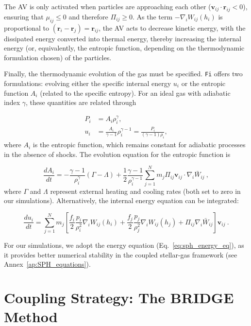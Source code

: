 The AV is only activated when particles are approaching each other ($\mathbf{v}_{ij} \cdot \mathbf{r}_{ij} < 0$), ensuring that $\mu_{ij} \leq 0$ and therefore $\Pi_{ij} \geq 0$. As the term $-\nabla_i W_{ij}(h_i)$ is proportional to $(\mathbf{r}_i - \mathbf{r}_j) = \mathbf{r}_{ij}$, the AV acts to decrease kinetic energy, with the dissipated energy converted into thermal energy, thereby increasing the internal energy (or, equivalently, the entropic function, depending on the thermodynamic formulation chosen) of the particles.

Finally, the thermodynamic evolution of the gas must be specified. \texttt{Fi} offers two formulations: evolving either the specific internal energy $u_i$ or the entropic function $A_i$ (related to the specific entropy). For an ideal gas with adiabatic index $\gamma$, these quantities are related through

\begin{align}
	P_i &= A_i \rho_i^{\gamma}, \label{eq:3.43_poly_eq_state}\\
	u_i &= \frac{A_i}{\gamma - 1} \rho_i^{\gamma - 1} = \frac{P_i}{(\gamma - 1)\rho_i} \label{eq:3.44_int_energy},
\end{align}
where $A_i$ is the entropic function, which remains constant for adiabatic processes in the absence of shocks. The evolution equation for the entropic function is

\begin{equation}
	\frac{dA_i}{dt} = -\frac{\gamma-1}{\rho_i^\gamma} (\Gamma - \Lambda) + \frac{1}{2} \frac{\gamma-1}{\rho_i^{\gamma-1}} \sum_{j=1}^N m_j \Pi_{ij} \mathbf{v}_{ij} \cdot \nabla_i \bar{W}_{ij}~,
\end{equation}
where $\Gamma$ and $\Lambda$ represent external heating and cooling rates (both set to zero in our simulations). Alternatively, the internal energy equation can be integrated:

\begin{equation}
	\frac{d u_i}{d t} = \sum_{j=1}^N m_j \left[ \frac{f_i}{2} \frac{p_i}{\rho_i^2} \nabla_i W_{ij}(h_i) +  \frac{f_j}{2} \frac{p_j}{\rho_j^2} \nabla_i W_{ij}(h_j)  + \Pi_{ij} \nabla_i \bar{W}_{ij}\right] \mathbf{v}_{ij}~. \label{eq:sph_energy_eq}
\end{equation}

For our simulations, we adopt the energy equation (Eq.~\eqref{eq:sph_energy_eq}), as it provides better numerical stability in the coupled stellar-gas framework (see Annex~\ref{ap:SPH_equations}).

\section{Coupling Strategy: The BRIDGE Method}
\label{sec:3.4_Coupling_codes}

